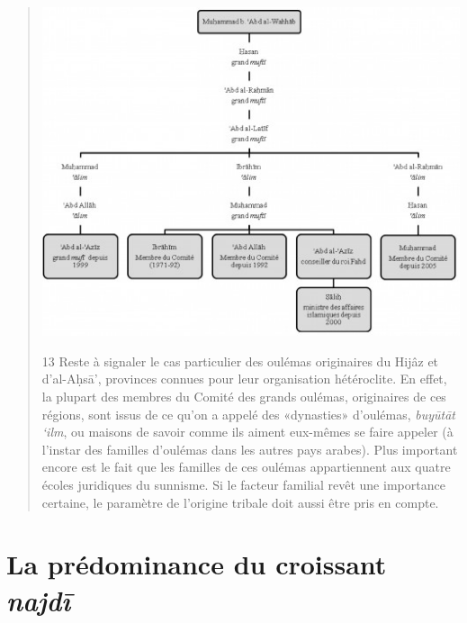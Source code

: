 \begin{quote}
\includegraphics[width=\textwidth]{CourantsIslamContemporain/ImagesCourantsIslamContemporain/genealogie.jpeg}

13 Reste à signaler le cas particulier des oulémas originaires du Hijâz
et d'al-Aḥsā', provinces connues pour leur organisation hétéroclite. En
effet, la plupart des membres du Comité des grands oulémas, originaires
de ces régions, sont issus de ce qu'on a appelé des «dynasties»
d'oulémas, \emph{buyūtāt `ilm}, ou maisons de savoir comme ils aiment
eux-mêmes se faire appeler (à l'instar des familles d'oulémas dans les
autres pays arabes). Plus important encore est le fait que les familles
de ces oulémas appartiennent aux quatre écoles juridiques du sunnisme.
Si le facteur familial revêt une importance certaine, le paramètre de
l'origine tribale doit aussi être pris en compte.
\end{quote}

\hypertarget{la-pruxe9dominance-du-croissant-najdux12b}{%
\section{\texorpdfstring{La prédominance du croissant
\emph{najdī}}{La prédominance du croissant najdī}}\label{la-pruxe9dominance-du-croissant-najdux12b}}

